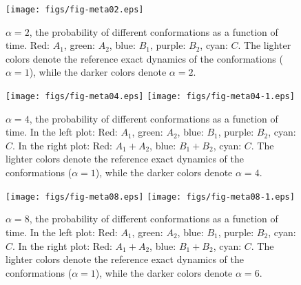 \documentclass[aip,jcp,a4paper,reprint,onecolumn]{revtex4-1}
\begin{document}
\begin{figure}
  \centering
  \texttt{[image: figs/fig-meta02.eps]}
  \caption{$\alpha = 2$, the probability of different conformations as
    a function of time.  Red: $A_1$, green: $A_2$, blue: $B_1$,
    purple: $B_2$, cyan: $C$.  The lighter colors denote the reference
    exact dynamics of the conformations ($\alpha = 1$), while the
    darker colors denote $\alpha = 2$.}
  \label{fig:tmp1}
\end{figure}

\begin{figure}
  \centering
  \texttt{[image: figs/fig-meta04.eps]}
  \texttt{[image: figs/fig-meta04-1.eps]}
  \caption{$\alpha = 4$, the probability of different conformations as a function of time.
    In the left plot: Red: $A_1$, green: $A_2$, blue: $B_1$, purple: $B_2$, cyan: $C$.
    In the right plot: Red: $A_1+A_2$, blue: $B_1+B_2$, cyan: $C$.
    The lighter colors denote the reference exact dynamics of the conformations ($\alpha = 1$), while the darker colors denote $\alpha = 4$.}
  \label{fig:tmp2}
\end{figure}



\begin{figure}
  \centering
  \texttt{[image: figs/fig-meta08.eps]}
  \texttt{[image: figs/fig-meta08-1.eps]}
  \caption{$\alpha = 8$, the probability of different conformations as a function of time.
    In the left plot: Red: $A_1$, green: $A_2$, blue: $B_1$, purple: $B_2$, cyan: $C$.
    In the right plot: Red: $A_1+A_2$, blue: $B_1+B_2$, cyan: $C$.
    The lighter colors denote the reference exact dynamics of the conformations ($\alpha = 1$), while the darker colors denote $\alpha = 6$.}
  \label{fig:tmp3}
\end{figure}
\end{document}
